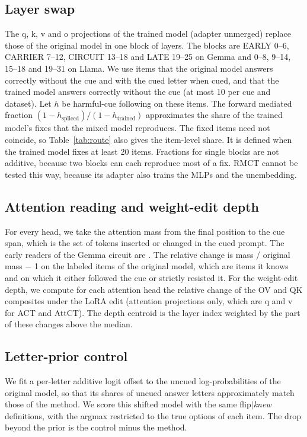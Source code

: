 \documentclass[11pt]{article}
\newcommand{\knew}{\textit{knew}}
\newcommand{\flipk}{flip$\mid$\knew}
\newcommand{\gemma}{Gemma}\newcommand{\gemmafull}{Gemma-2-2B-it}
\newcommand{\llama}{Llama}\newcommand{\llamafull}{Llama-3.1-8B-Instruct}
\begin{document}
\subsection{Layer swap}
The q, k, v and o projections of the trained model (adapter unmerged) replace those of the original model in one block of layers. The blocks are EARLY 0--6, CARRIER 7--12, CIRCUIT 13--18 and LATE 19--25 on \gemma{} and 0--8, 9--14, 15--18 and 19--31 on \llama. We use items that the original model answers correctly without the cue and with the cued letter when cued, and that the trained model answers correctly without the cue (at most 10 per cue and dataset). Let $h$ be harmful-cue following on these items. The forward mediated fraction $(1-h_{\mathrm{spliced}})/(1-h_{\mathrm{trained}})$ approximates the share of the trained model's fixes that the mixed model reproduces. The fixed items need not coincide, so Table~\ref{tab:route} also gives the item-level share. It is defined when the trained model fixes at least 20 items. Fractions for single blocks are not additive, because two blocks can each reproduce most of a fix. RMCT cannot be tested this way, because its adapter also trains the MLPs and the unembedding.

\subsection{Attention reading and weight-edit depth}
For every head, we take the attention mass from the final position to the cue span, which is the set of tokens inserted or changed in the cued prompt. The early readers of the \gemma{} circuit are \vGemEarlyReaders. The relative change is mass / original mass $-$ 1 on the labeled items of the original model, which are items it knows and on which it either followed the cue or strictly resisted it. For the weight-edit depth, we compute for each attention head the relative change of the OV and QK composites under the LoRA edit (attention projections only, which are q and v for ACT and AttCT). The depth centroid is the layer index weighted by the part of these changes above the median.

\subsection{Letter-prior control}
We fit a per-letter additive logit offset to the uncued log-probabilities of the original model, so that its shares of uncued answer letters approximately match those of the method. We score this shifted model with the same \flipk{} definitions, with the argmax restricted to the true options of each item. The drop beyond the prior is the control minus the method.
\end{document}
